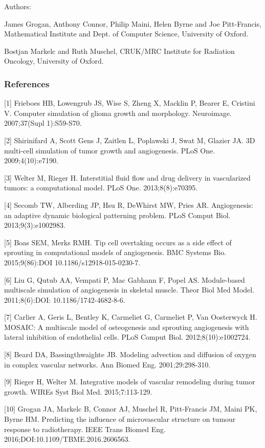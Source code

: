 \documentclass[fullpage,11pt]{article}
\begin{document}
\noindent Authors: 

James Grogan, Anthony Connor, Philip Maini, Helen Byrne and Joe Pitt-Francis, Mathematical Institute and Dept. of Computer Science, University of Oxford.

Bostjan Markelc and Ruth Muschel, CRUK/MRC Institute for Radiation Oncology, University of Oxford.

\subsubsection*{References}

[1] Frieboes HB, Lowengrub JS, Wise S, Zheng X, Macklin P, Bearer E, Cristini V. Computer simulation of glioma growth and morphology. Neuroimage. 2007;37(Supl 1):S59-S70.

[2] Shirinifard A, Scott Gens J, Zaitlen L, Poplawski J, Swat M, Glazier JA. 3D multi-cell simulation of tumor growth and angiogenesis. PLoS One. 2009;4(10):e7190.

[3] Welter M, Rieger H. Interstitial fluid flow and drug delivery in vascularized tumors: a computational model. PLoS One. 2013;8(8):e70395.

[4] Secomb TW, Alberding JP, Hsu R, DeWhirst MW, Pries AR. Angiogenesis: an adaptive dynamic biological patterning problem. PLoS Comput Biol. 2013;9(3):e1002983.

[5] Boas SEM, Merks RMH. Tip cell overtaking occurs as a side effect of sprouting in computational models of angiogenesis. BMC Systems Bio. 2015;9(86):DOI 10.1186/s12918-015-0230-7.

[6] Liu G, Qutub AA, Vempati P, Mac Gabhann F, Popel AS. Module-based multiscale simulation of angiogenesis in skeletal muscle. Theor Biol Med Model. 2011;8(6):DOI: 10.1186/1742-4682-8-6.

[7] Carlier A, Geris L, Bentley K, Carmeliet G, Carmeliet P, Van Oosterwyck H. MOSAIC: A multiscale model of osteogenesis and sprouting angiogenesis with lateral inhibition of endothelial cells. PLoS Comput Biol. 2012;8(10):e1002724.

[8] Beard DA, Bassingthwaighte JB. Modeling advection and diffusion of oxygen in complex vascular
networks. Ann Biomed Eng. 2001;29:298-310.

[9] Rieger H, Welter M. Integrative models of vascular remodeling during tumor growth. WIREs Syst Biol Med. 2015;7:113-129.

[10] Grogan JA, Markelc B, Connor AJ, Muschel R, Pitt-Francis JM, Maini PK, Byrne HM. Predicting the influence of microvascular structure on tumour response to radiotherapy. IEEE Trans Biomed Eng. 2016;DOI:10.1109/TBME.2016.2606563.
\end{document}
